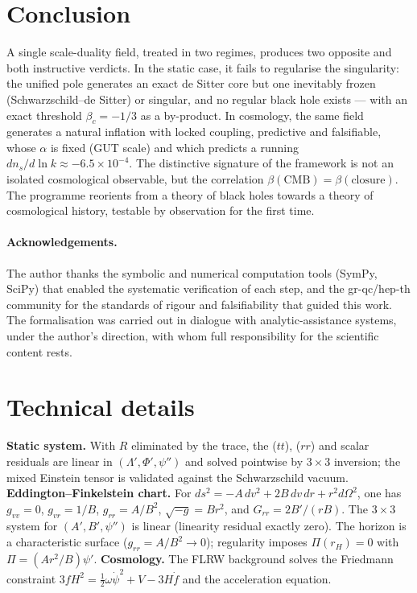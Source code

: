 \documentclass[11pt,a4paper]{article}
\theoremstyle{plain}
\theoremstyle{remark}
\renewcommand{\thesection}{\Roman{section}}
\begin{document}
\section{Conclusion}
A single scale-duality field, treated in two regimes, produces two opposite and both
instructive verdicts. In the static case, it fails to regularise the singularity: the
unified pole generates an exact de Sitter core but one inevitably frozen
(Schwarzschild--de Sitter) or singular, and no regular black hole exists --- with an exact
threshold $\beta_c=-1/3$ as a by-product. In cosmology, the same field generates a natural
inflation with locked coupling, predictive and falsifiable, whose $\alpha$ is fixed (GUT
scale) and which predicts a running $dn_s/d\ln k\approx-6.5\times10^{-4}$. The distinctive
signature of the framework is not an isolated cosmological observable, but the correlation
$\beta(\mathrm{CMB})=\beta(\text{closure})$. The programme reorients from a theory of black
holes towards a theory of cosmological history, testable by observation for the first time.

\paragraph{Acknowledgements.} The author thanks the symbolic and numerical computation tools
(SymPy, SciPy) that enabled the systematic verification of each step, and the gr-qc/hep-th
community for the standards of rigour and falsifiability that guided this work. The
formalisation was carried out in dialogue with analytic-assistance systems, under the
author's direction, with whom full responsibility for the scientific content rests.

\appendix
\renewcommand{\thesection}{\Alph{section}}
\section{Technical details}
\textbf{Static system.} With $R$ eliminated by the trace, the ($tt$), ($rr$) and scalar
residuals are linear in $(\Lambda',\Phi',\psi'')$ and solved pointwise by $3\times3$
inversion; the mixed Einstein tensor is validated against the Schwarzschild vacuum.
\textbf{Eddington--Finkelstein chart.} For $ds^2=-A\,dv^2+2B\,dv\,dr+r^2d\Omega^2$, one has
$g_{vv}=0$, $g_{vr}=1/B$, $g_{rr}=A/B^2$, $\sqrt{-g}=Br^2$, and $G_{rr}=2B'/(rB)$. The
$3\times3$ system for $(A',B',\psi'')$ is linear (linearity residual exactly zero). The
horizon is a characteristic surface ($g_{rr}=A/B^2\to0$); regularity imposes $\Pi(r_H)=0$
with $\Pi=(Ar^2/B)\psi'$. \textbf{Cosmology.} The FLRW background solves the Friedmann
constraint $3fH^2=\tfrac12\omega\dot\psi^2+V-3H\dot f$ and the acceleration equation.
\end{document}
